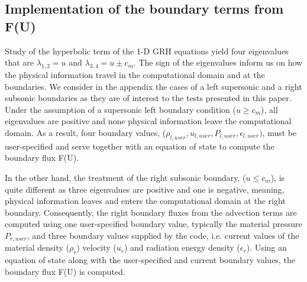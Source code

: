 \subsection{Implementation of the boundary terms from F(U)}
%
Study of the hyperbolic term of the 1-D GRH equations yield four eigenvalues that are $\lambda_{1,2}=u$ and $\lambda_{3,4}=u \pm c_m$. The sign of the eigenvalues inform us on how the physical information travel in the computational domain and at the boundaries. We consider in the appendix the cases of a left supersonic and a right subsonic boundaries as they are of interest to the tests presented in this paper. Under the assumption of a supersonic left boundary condition ($u \geq c_m$), all eigenvalues are positive and none physical information leave the computational domain. As a result, four boundary values, ($\rho_{l, user}, u_{l, user}, P_{l, user}, \epsilon_{l, user})$, must be user-specified and serve together with an equation of state to compute the boundary flux F(U). 

In the other hand, the treatment of the right subsonic boundary, ($u \leq c_m$), is quite different as three eigenvalues are positive and one is negative, meaning, physical information leaves and enters the computational domain at the right boundary. Consequently, the right boundary fluxes from the advection terms are computed using one user-specified boundary value, typically the material pressure $P_{r, user}$, and three boundary values supplied by the code, i.e. current values of the material density ($\rho_{r}$) velocity ($u_{r}$) and radiation energy density ($\epsilon_{r}$). Using an equation of state along with the user-specified and current boundary values, the boundary flux F(U) is computed.
%
